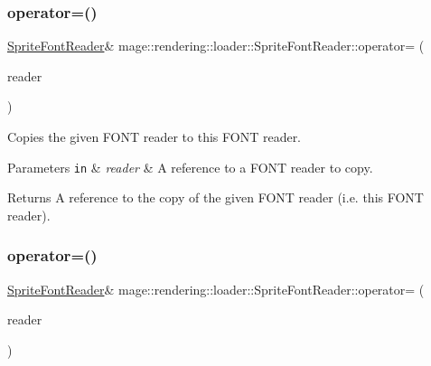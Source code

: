 \subsubsection{\texorpdfstring{operator=()}{operator=()}\hspace{0.1cm}{\footnotesize\ttfamily [1/2]}}
{\footnotesize\ttfamily \mbox{\hyperlink{classmage_1_1rendering_1_1loader_1_1_sprite_font_reader}{Sprite\+Font\+Reader}}\& mage\+::rendering\+::loader\+::\+Sprite\+Font\+Reader\+::operator= (\begin{DoxyParamCaption}\item[{const \mbox{\hyperlink{classmage_1_1rendering_1_1loader_1_1_sprite_font_reader}{Sprite\+Font\+Reader}} \&}]{reader }\end{DoxyParamCaption})\hspace{0.3cm}{\ttfamily [delete]}}

Copies the given F\+O\+NT reader to this F\+O\+NT reader.


\begin{DoxyParams}[1]{Parameters}
\mbox{\tt in}  & {\em reader} & A reference to a F\+O\+NT reader to copy. \\
\hline
\end{DoxyParams}
\begin{DoxyReturn}{Returns}
A reference to the copy of the given F\+O\+NT reader (i.\+e. this F\+O\+NT reader). 
\end{DoxyReturn}
\mbox{\label{classmage_1_1rendering_1_1loader_1_1_sprite_font_reader_ac6902b3475ae8425d475de59135a11a3}} 
\subsubsection{\texorpdfstring{operator=()}{operator=()}\hspace{0.1cm}{\footnotesize\ttfamily [2/2]}}
{\footnotesize\ttfamily \mbox{\hyperlink{classmage_1_1rendering_1_1loader_1_1_sprite_font_reader}{Sprite\+Font\+Reader}}\& mage\+::rendering\+::loader\+::\+Sprite\+Font\+Reader\+::operator= (\begin{DoxyParamCaption}\item[{\mbox{\hyperlink{classmage_1_1rendering_1_1loader_1_1_sprite_font_reader}{Sprite\+Font\+Reader}} \&\&}]{reader }\end{DoxyParamCaption})\hspace{0.3cm}{\ttfamily [delete]}}

